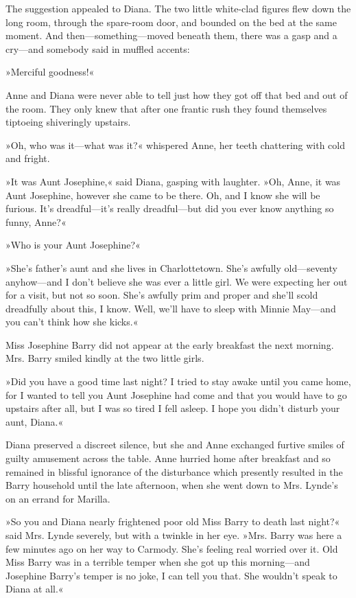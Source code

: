 The suggestion appealed to Diana. The two little white-clad figures flew down the long room, through the spare-room door, and bounded on the bed at the same moment. And then—something—moved beneath them, there was a gasp and a cry—and somebody said in muffled accents:

»Merciful goodness!«

Anne and Diana were never able to tell just how they got off that bed and out of the room. They only knew that after one frantic rush they found themselves tiptoeing shiveringly upstairs.

»Oh, who was it—what was it?« whispered Anne, her teeth chattering with cold and fright.

»It was Aunt Josephine,« said Diana, gasping with laughter. »Oh, Anne, it was Aunt Josephine, however she came to be there. Oh, and I know she will be furious. It’s dreadful—it’s really dreadful—but did you ever know anything so funny, Anne?«

»Who is your Aunt Josephine?«

»She’s father’s aunt and she lives in Charlottetown. She’s awfully old—seventy anyhow—and I don’t believe she was ever a little girl. We were expecting her out for a visit, but not so soon. She’s awfully prim and proper and she’ll scold dreadfully about this, I know. Well, we’ll have to sleep with Minnie May—and you can’t think how she kicks.«

Miss Josephine Barry did not appear at the early breakfast the next morning. Mrs. Barry smiled kindly at the two little girls.

»Did you have a good time last night? I tried to stay awake until you came home, for I wanted to tell you Aunt Josephine had come and that you would have to go upstairs after all, but I was so tired I fell asleep. I hope you didn’t disturb your aunt, Diana.«

Diana preserved a discreet silence, but she and Anne exchanged furtive smiles of guilty amusement across the table. Anne hurried home after breakfast and so remained in blissful ignorance of the disturbance which presently resulted in the Barry household until the late afternoon, when she went down to Mrs. Lynde’s on an errand for Marilla.

»So you and Diana nearly frightened poor old Miss Barry to death last night?« said Mrs. Lynde severely, but with a twinkle in her eye. »Mrs. Barry was here a few minutes ago on her way to Carmody. She’s feeling real worried over it. Old Miss Barry was in a terrible temper when she got up this morning—and Josephine Barry’s temper is no joke, I can tell you that. She wouldn’t speak to Diana at all.«

